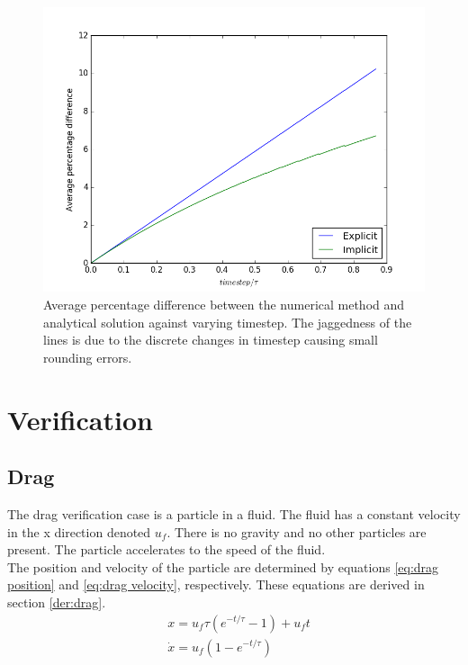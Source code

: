 \documentclass[10pt,a4paper,titlepage]{report}
\begin{document}
\begin{figure}[!htb]
\centering
\includegraphics[scale=0.6]{figures/AveragePercentageDifferenceAgainstTimestep.png}
\caption{Average percentage difference between the numerical method and analytical solution against varying timestep. The jaggedness of the lines is due to the discrete changes in timestep causing small rounding errors.}
\label{fig:avg_percent_diff_against_timestep}
\end{figure}
\section{Verification}
\label{sec:verification}
\subsection{Drag}
The drag verification case is a particle in a fluid. The fluid has a constant velocity in the x direction denoted $u_f$. There is no gravity and no other particles are present. The particle accelerates to the speed of the fluid.
\\The position and velocity of the particle are determined by equations \ref{eq:drag position} and \ref{eq:drag velocity}, respectively. These equations are derived in section \ref{der:drag}.
\begin{align}
&x = u_f \tau (e^{-t/\tau} - 1) + u_f t \label{eq:drag position} \\
&\dot{x} = u_f (1 - e^{-t/\tau}) \label{eq:drag velocity} \\
\end{align}
\end{document}
